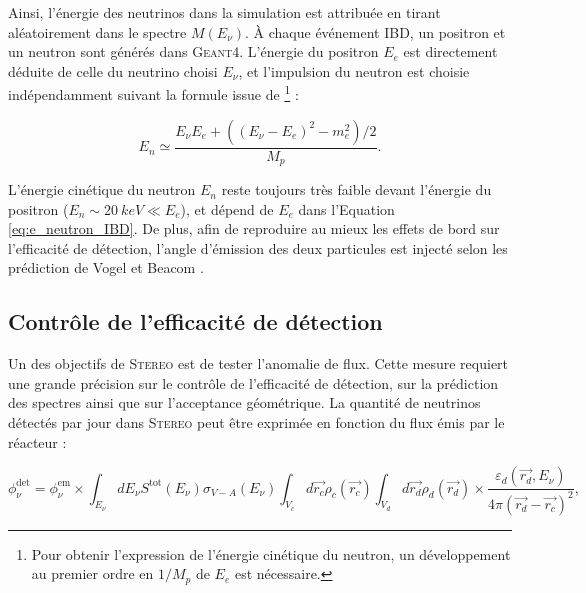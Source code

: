 Ainsi, l'énergie des neutrinos dans la simulation est attribuée en tirant aléatoirement dans le spectre $M(E_\nu)$. À chaque événement IBD, un positron et un neutron sont générés dans \textsc{Geant4}. L'énergie du positron $E_e$ est directement déduite de celle du neutrino choisi $E_\nu$, et l'impulsion du neutron est choisie indépendamment suivant la formule issue de \cite{Vogel:1999zy}\footnote{Pour obtenir l'expression de l'énergie cinétique du neutron, un développement au premier ordre en $1/M_p$ de $E_e$ est nécessaire.} :

\begin{equation}
\label{eq:e_neutron_IBD}
    E_n \simeq \frac{E_\nu E_e + ((E_\nu - E_e)^2 - m_e^2)/2}{M_p}.
\end{equation}

\bigbreak

L'énergie cinétique du neutron $E_n$ reste toujours très faible devant l'énergie du positron ($E_n \sim \SI{20}{keV} \ll E_e$), et dépend de $E_e$ dans l'Equation \ref{eq:e_neutron_IBD}. De plus, afin de reproduire au mieux les effets de bord sur l'efficacité de détection, l'angle d'émission des deux particules est injecté selon les prédiction de Vogel et Beacom \cite{Vogel:1999zy}.


\bigbreak

\subsection{Contrôle de l'efficacité de détection}
\label{sec:control_eff_det}

Un des objectifs de \textsc{Stereo} est de tester l'anomalie de flux. Cette mesure requiert une grande précision sur le contrôle de l'efficacité de détection, sur la prédiction des spectres ainsi que sur l'acceptance géométrique. La quantité de neutrinos détectés par jour dans \textsc{Stereo} peut être exprimée en fonction du flux émis par le réacteur :

\begin{equation}
\label{eq:nu_det_eff_def}
    \phi_\nu^{\textrm{det}} = \phi_\nu^{\textrm{em}} \times \int_{E_\nu} dE_\nu S^\textrm{tot}(E_\nu) \sigma_{V-A}(E_\nu) \int_{V_c} d\overrightarrow{r_c} \rho_c(\overrightarrow{r_c}) \int_{V_d} d\overrightarrow{r_d} \rho_d(\overrightarrow{r_d}) \times \frac{\varepsilon_d(\overrightarrow{r_d}, E_\nu)}{4\pi (\overrightarrow{r_d} - \overrightarrow{r_c})^2},
\end{equation}


